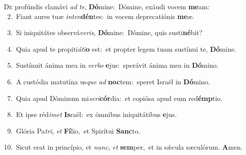 \lettrine{\initial\textcolor{\initialcolor}{D}}{e} profúndis clamávi \textit{ad} \textit{te}\-, \textbf{Dó}\-mine:~\star Dómine, exáudi vocem \textbf{me}\-am:\\
{\numbfont\textcolor{\numbcolor}{~2.}}~Fiant aures tuæ \textit{in}\-\textit{ten}\textbf{dén}tes:~\star in vocem deprecatiónis \textbf{me}\-æ.\par
{\numbfont\textcolor{\numbcolor}{~3.}}~Si iniquitátes observá\-\textit{ve}\-\textit{ris}, \textbf{Dó}\-mine:~\star Dómine, quis susti\-\textbf{né}\-bit?\par
{\numbfont\textcolor{\numbcolor}{~4.}}~Quia apud te propiti\-\textit{á}\-\textit{ti}\textbf{o} est:~\star et propter legem tuam sustínui te, \textbf{Dó}\-mine.\par
{\numbfont\textcolor{\numbcolor}{~5.}}~Sustínuit ánima mea in \textit{ver}\-\textit{bo} \textbf{e}\-jus:~\star sperávit ánima mea in \textbf{Dó}\-mino.\par
{\numbfont\textcolor{\numbcolor}{~6.}}~A custódia matutína us\textit{que} \textit{ad} \textbf{noc}\-tem:~\star speret Israël in \textbf{Dó}\-mino.\par
{\numbfont\textcolor{\numbcolor}{~7.}}~Quia apud Dóminum mi\-\textit{se}\-\textit{ri}\textbf{cór}dia:~\star et copiósa apud eum red\-\textbf{émp}\-tio.\par
{\numbfont\textcolor{\numbcolor}{~8.}}~Et ipse réd\-\textit{i}\-\textit{met} \textbf{Is}\-raël:~\star ex ómnibus iniquitátibus \textbf{e}\-jus.\par
{\numbfont\textcolor{\numbcolor}{~9.}}~Glória Pa\-\textit{tri}\-, \textit{et} \textbf{Fí}\-lio,~\star et Spirítui \textbf{Sanc}\-to.\par
{\numbfont\textcolor{\numbcolor}{10.}}~Sicut erat in princípio, et \textit{nunc}\-, \textit{et} \textbf{sem}\-per,~\star et in sǽcula sæculórum. \textbf{A}\-men.\par

